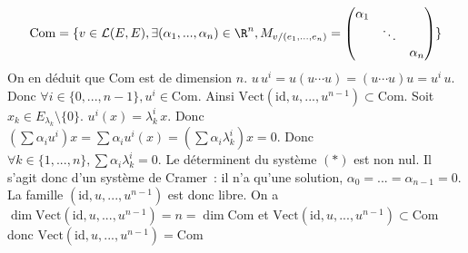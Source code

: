 {\begin{enumerate}
{$$    \mathrm{Com}=\{v\in\mathcal{L}(E,E), \exists (\alpha_{1},...,\alpha_{n})\in\R^{n},
    M_{v/(e_{1},...,e_{n})}=
      \begin{pmatrix}
        \alpha_{1}& & \\ &\ddots& \\ & & \alpha_{n}
      \end{pmatrix}
      \}$$
    On en déduit que $\mathrm{Com}$ est de dimension $n$.
$u\,u^{i}=u(u\cdots u)=(u\cdots u)u=u^{i}\, u$. Donc $\forall
    i\in\{0,...,n-1\}, u^{i}\in\mathrm{Com}$. Ainsi
    $\mathrm{Vect}(\mathrm{id},u,...,u^{n-1})\subset\mathrm{Com}$.
Soit $x_{k}\in E_{\lambda_{k}}\setminus\{0\}$.
    $u^{i}(x)=\lambda_{k}^{i}\,x$. Donc $(\sum \alpha_{i}u^{i})x
    =\sum\alpha_{i}u^{i}(x) =(\sum\alpha_{i}\lambda_{k}^{i})x=0$. Donc
    $\forall k\in\{1,...,n\}, \sum\alpha_{i}\lambda_{k}^{i}=0$.
Le déterminent du système $(*)$ est non nul. Il s'agit donc d'un
    système de Cramer~: il n'a qu'une solution,
    $\alpha_{0}=...=\alpha_{n-1}=0$. La famille $(\mathrm{id}, u, ..., u^{n-1})$
    est donc libre.
On a $\dim\mathrm{Vect}(\mathrm{id}, u, ..., u^{n-1})=n=\dim\mathrm{Com}$ et $\mathrm{Vect}(\mathrm{id}, u,
    ..., u^{n-1})\subset\mathrm{Com}$ donc $\mathrm{Vect}(\mathrm{id}, u, ..., u^{n-1})=\mathrm{Com}$
}
\end{enumerate}
}
